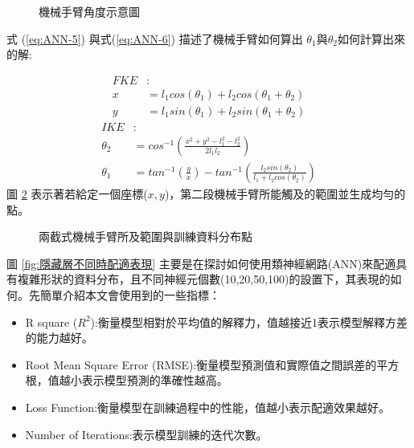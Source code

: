\documentclass[12pt, a4paper]{article}
\begin{document}
\begin{figure}[H]
    \caption{機械手臂角度示意圖}
    \label{fig:機械手臂角度示意圖}
\end{figure}
式 (\ref{eq:ANN-5}) 與式(\ref{eq:ANN-6}) 描述了機械手臂如何算出 $\theta _1$與$\theta _2$如何計算出來的解:

\begin{align}\label{eq:ANN-5}\nonumber
FKE&:\\ \nonumber
x&=l_1cos(\theta _1)+l_2cos(\theta_1+\theta _2)\\
y&=l_1sin(\theta_1)+l_2sin(\theta_1+\theta _2)
\end{align}
\begin{align}\label{eq:ANN-6}\nonumber
IKE&:\\ \nonumber
\theta_2&=cos^{-1}\left(\frac{x^2+y^2-l^2_1-l^2_2}{2l_1l_2}\right)\\
\theta_1&=tan^{-1}\left(\frac{y}{x}\right)-tan^{-1}\left(\frac{l_2sin(\theta _2)}{l_1+l_2cos(\theta _2)}\right)
\end{align}
圖 \ref{fig:兩截式機械手臂所及範圍與訓練資料分布點} 表示著若給定一個座標($x,y$)，第二段機械手臂所能觸及的範圍並生成均勻的點。
\begin{figure}[H]
    \caption{兩截式機械手臂所及範圍與訓練資料分布點}
    \label{fig:兩截式機械手臂所及範圍與訓練資料分布點}
\end{figure}
圖 \ref{fig:隱藏層不同時配適表現} 主要是在探討如何使用類神經網路(ANN)來配適具有複雜形狀的資料分布，且不同神經元個數(10,20,50,100)的設置下，其表現的如何。先簡單介紹本文會使用到的一些指標：
\begin{itemize}
\item R square ($R^2$):衡量模型相對於平均值的解釋力，值越接近1表示模型解釋方差的能力越好。
\item Root Mean Square Error (RMSE):衡量模型預測值和實際值之間誤差的平方根，值越小表示模型預測的準確性越高。
\item Loss Function:衡量模型在訓練過程中的性能，值越小表示配適效果越好。
\item Number of Iterations:表示模型訓練的迭代次數。
\end{itemize}
\end{document}
